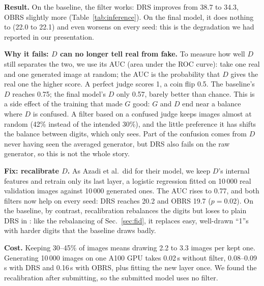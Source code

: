 \textbf{Result.} On the baseline, the filter works: DRS improves \finc{} from 38.7 to 34.3, OBRS slightly more
(Table~\ref{tab:inference}). On the final model, it does nothing to \finc{} (22.0 to 22.1) and even worsens \fcnn{} on
every seed: this is the degradation we had reported in our presentation.

\textbf{Why it fails: $D$ can no longer tell real from fake.} To measure how well $D$ still separates the two, we use its
AUC (area under the ROC curve): take one real and one generated image at random; the AUC is the probability that $D$ gives
the real one the higher score. A perfect judge scores 1, a coin flip 0.5. The baseline's $D$ reaches 0.75; the final
model's $D$ only 0.57, barely better than chance. This is a side effect of the training that made $G$ good: $G$ and $D$ end near a balance where $D$ is confused. A
filter based on a confused judge keeps images almost at random (42\% instead of the intended 30\%), and the little
preference it has shifts the balance between digits, which only \fcnn{} sees. Part of the confusion comes from $D$ never
having seen the averaged generator, but DRS also fails on the raw generator, so this is not the whole story.

\textbf{Fix: recalibrate $D$.} As Azadi et al.\ did for their model, we keep $D$'s internal features and retrain only its
last layer, a logistic regression fitted on 10\,000 real validation images against 10\,000 generated ones. The AUC rises
to 0.77, and both filters now help on every seed: DRS reaches 20.2 and OBRS 19.7 ($p=0.02$). On the baseline, by
contrast, recalibration rebalances the digits but loses to plain DRS in \finc{}: like the rebalancing of
Sec.~\ref{sec:fid}, it replaces easy, well-drawn ``1''s with harder digits that the baseline draws badly.

\textbf{Cost.} Keeping 30--45\% of images means drawing 2.2 to 3.3 images per kept one. Generating 10\,000 images on one
A100 GPU takes 0.02\,s without filter, 0.08--0.09\,s with DRS and 0.16\,s with OBRS, plus fitting the new layer once.
We found the recalibration after submitting, so the submitted model uses no filter.

